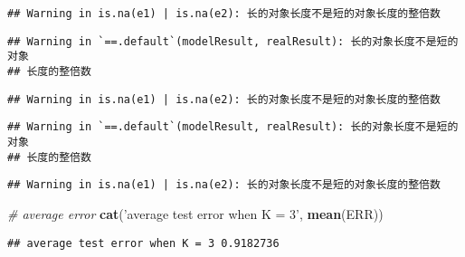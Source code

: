 \documentclass[]{article}
\newenvironment{Shaded}{\begin{snugshade}}{\end{snugshade}}
\newcommand{\CommentTok}[1]{\textcolor[rgb]{0.56,0.35,0.01}{\textit{#1}}}
\newcommand{\ControlFlowTok}[1]{\textcolor[rgb]{0.13,0.29,0.53}{\textbf{#1}}}
\newcommand{\DataTypeTok}[1]{\textcolor[rgb]{0.13,0.29,0.53}{#1}}
\newcommand{\DecValTok}[1]{\textcolor[rgb]{0.00,0.00,0.81}{#1}}
\newcommand{\KeywordTok}[1]{\textcolor[rgb]{0.13,0.29,0.53}{\textbf{#1}}}
\newcommand{\NormalTok}[1]{#1}
\newcommand{\OperatorTok}[1]{\textcolor[rgb]{0.81,0.36,0.00}{\textbf{#1}}}
\newcommand{\StringTok}[1]{\textcolor[rgb]{0.31,0.60,0.02}{#1}}
\begin{document}
\begin{verbatim}
## Warning in is.na(e1) | is.na(e2): 长的对象长度不是短的对象长度的整倍数
\end{verbatim}

\begin{verbatim}
## Warning in `==.default`(modelResult, realResult): 长的对象长度不是短的对象
## 长度的整倍数
\end{verbatim}

\begin{verbatim}
## Warning in is.na(e1) | is.na(e2): 长的对象长度不是短的对象长度的整倍数
\end{verbatim}

\begin{verbatim}
## Warning in `==.default`(modelResult, realResult): 长的对象长度不是短的对象
## 长度的整倍数
\end{verbatim}

\begin{verbatim}
## Warning in is.na(e1) | is.na(e2): 长的对象长度不是短的对象长度的整倍数
\end{verbatim}

\begin{Shaded}
\begin{Highlighting}[]
\CommentTok{# average error}
\KeywordTok{cat}\NormalTok{(}\StringTok{'average test error when K = 3'}\NormalTok{, }\KeywordTok{mean}\NormalTok{(ERR))}
\end{Highlighting}
\end{Shaded}

\begin{verbatim}
## average test error when K = 3 0.9182736
\end{verbatim}

\begin{Shaded}
\end{Shaded}
\end{document}
